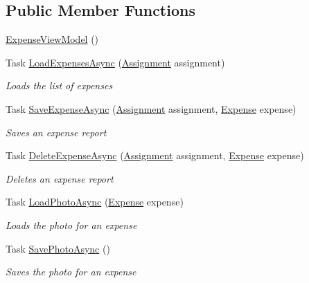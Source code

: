 \subsection*{Public Member Functions}
\begin{DoxyCompactItemize}
\item 
\hyperlink{class_field_service_1_1_view_models_1_1_expense_view_model_a7d6f430df905f489ab3d49bb8e96cfcf}{Expense\+View\+Model} ()
\item 
Task \hyperlink{class_field_service_1_1_view_models_1_1_expense_view_model_a0a503e1b11f0490cfac4849681ddbf9b}{Load\+Expenses\+Async} (\hyperlink{class_field_service_1_1_data_1_1_assignment}{Assignment} assignment)
\begin{DoxyCompactList}\small\item\em Loads the list of expenses \end{DoxyCompactList}\item 
Task \hyperlink{class_field_service_1_1_view_models_1_1_expense_view_model_adb3cf56d6796474ca8f8efffeb94fbc9}{Save\+Expense\+Async} (\hyperlink{class_field_service_1_1_data_1_1_assignment}{Assignment} assignment, \hyperlink{class_field_service_1_1_data_1_1_expense}{Expense} expense)
\begin{DoxyCompactList}\small\item\em Saves an expense report \end{DoxyCompactList}\item 
Task \hyperlink{class_field_service_1_1_view_models_1_1_expense_view_model_a5233da6b54528f3196856226dbcb3621}{Delete\+Expense\+Async} (\hyperlink{class_field_service_1_1_data_1_1_assignment}{Assignment} assignment, \hyperlink{class_field_service_1_1_data_1_1_expense}{Expense} expense)
\begin{DoxyCompactList}\small\item\em Deletes an expense report \end{DoxyCompactList}\item 
Task \hyperlink{class_field_service_1_1_view_models_1_1_expense_view_model_ae5fd2a7b65fa43f4014c3f7ea4ad1a79}{Load\+Photo\+Async} (\hyperlink{class_field_service_1_1_data_1_1_expense}{Expense} expense)
\begin{DoxyCompactList}\small\item\em Loads the photo for an expense \end{DoxyCompactList}\item 
Task \hyperlink{class_field_service_1_1_view_models_1_1_expense_view_model_a7ba76bda4a7b05127f24e5f21b0dc77f}{Save\+Photo\+Async} ()
\begin{DoxyCompactList}\small\item\em Saves the photo for an expense \end{DoxyCompactList}\end{DoxyCompactItemize}
